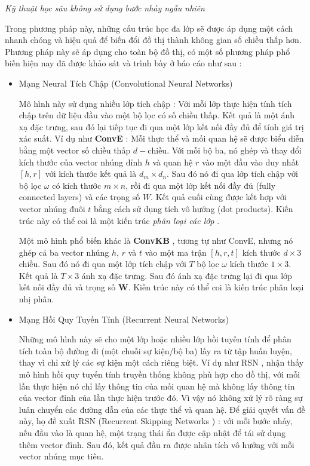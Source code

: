 \textit{Kỹ thuật học sâu không sử dụng bước nhảy ngẫu nhiên}

Trong phương pháp này, những cấu trúc học đa lớp sẽ được áp dụng một cách nhanh chóng và hiệu quả để biến đổi đồ thị thành không gian số chiều thấp hơn. Phương pháp này sẽ áp dụng cho toàn bộ đồ thị, có một số phương pháp phổ biến hiện nay đã được khảo sát và trình bày ở báo cáo \cite{rossi2020knowledge} như sau :

\begin{itemize}
	\item Mạng Neural Tích Chập (Convolutional Neural Networks)
	
	Mô hình này sử dụng nhiều lớp tích chập : Với mỗi lớp thực hiện tính tích chập trên dữ liệu đầu vào một bộ lọc có số chiều thấp. Kết quả là một ánh xạ đặc trưng, sau đó lại tiếp tục đi qua một lớp kết nối đầy đủ để tính giá trị xác suất. Ví dụ như \textbf{ConvE} \cite{dettmers2017convolutional} : Mỗi thực thể và mối quan hệ sẽ được biểu diễn bằng một vector số chiều thấp $d-\text{chiều}$. Với mỗi bộ ba, nó ghép và thay đổi kích thước của vector nhúng đỉnh $h$ và quan hệ $r$ vào một đầu vào duy nhất $[h, r]$ với kích thước kết quả là $d_m \times d_n$. Sau đó nó đi qua lớp tích chập với bộ lọc $\omega$ có kích thước $m \times n$, rồi đi qua một lớp kết nối đầy đủ  (fully connected layers) và các trọng số $W$. Kết quả cuối cùng được kết hợp với vector nhúng đuôi $t$ bằng cách sử dụng tích vô hướng (dot products). Kiến trúc này có thể coi là một kiến trúc \textit{phân loại các lớp} .
	
	Một mô hình phổ biến khác là \textbf{ConvKB} \cite{nguyen2017novel}, tương tự như ConvE, nhưng nó ghép cả ba vector nhúng $h$, $r$ và $t$ vào một ma trận $[h, r, t]$ kích thước $d \times 3$ chiều. Sau đó nó đi qua một lớp tích chập với $T$ bộ lọc $\omega$ kích thước $1 \times 3$. Kết quả là $T \times 3$ ánh xạ đặc trưng. Sau đó ánh xạ đặc trưng lại đi qua lớp kết nối đầy đủ và trọng số $\mathbf{W}$. Kiến trúc này có thể coi là kiến trúc phân loại nhị phân.
	
	\item Mạng Hồi Quy Tuyến Tính (Recurrent Neural Networks)
	
	Những mô hình này sẽ cho một lớp hoặc nhiều lớp hồi tuyến tính để phân tích toàn bộ đường đi (một chuỗi sự kiện/bộ ba) lấy ra từ tập huấn luyện, thay vì chỉ xử lý các sự kiện một cách riêng biệt. Ví dụ như RSN \cite{guo2019learning}, nhận thấy mô hình hồi quy tuyến tính truyền thống không phù hợp cho đồ thị, với mỗi lần thực hiện nó chỉ lấy thông tin của mối quan hệ mà không lấy thông tin của vector đỉnh của lần thực hiện trước đó. Vì vậy nó không xử lý rõ ràng sự luân chuyển các đường dẫn của các thực thể và quan hệ. Để giải quyết vấn đề này, họ đề xuất RSN (Recurrent Skipping Networks \cite{guo2019learning}) : với mỗi bước nhảy, nếu đầu vào là quan hệ, một trạng thái ẩn được cập nhật để tái sử dụng thêm vector đỉnh. Sau đó, kết quả đầu ra được nhân tích vô hướng với mỗi vector nhúng mục tiêu.
	

\end{itemize}
